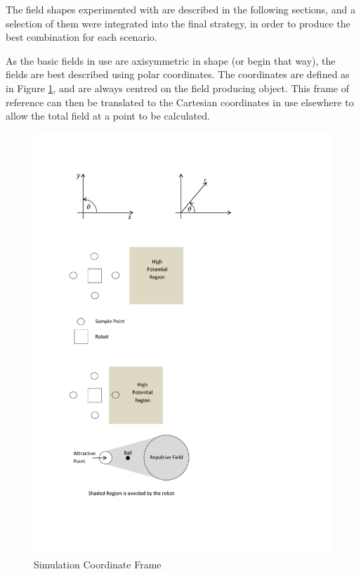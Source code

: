 \documentclass[10pt]{article}
\begin{document}
The field shapes experimented with are described in the following sections, and
a selection of them were integrated into the final strategy, in order to produce
the best combination for each scenario.

As the basic fields in use are axisymmetric in shape (or begin that way), the
fields are best described using polar coordinates. The coordinates are defined
as in Figure \ref{fig:polarCoordinateFrame}, and are always centred on the field
producing object. This frame of reference can then be translated to the
Cartesian coordinates in use elsewhere to allow the total field at a point to be
calculated.

\begin{figure}
 \centering
 \includegraphics[trim=9cm 23.5cm 7cm 2cm, clip=true]{Images/illustrations}
 \caption{Simulation Coordinate Frame}
 \label{fig:polarCoordinateFrame}
\end{figure}
\end{document}
